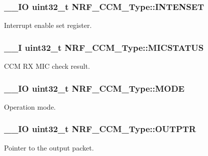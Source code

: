\subsubsection[{I\+N\+T\+E\+N\+S\+E\+T}]{\setlength{\rightskip}{0pt plus 5cm}\+\_\+\+\_\+\+I\+O uint32\+\_\+t N\+R\+F\+\_\+\+C\+C\+M\+\_\+\+Type\+::\+I\+N\+T\+E\+N\+S\+E\+T}\label{struct_n_r_f___c_c_m___type_a8f1c101c4fd7a2b467b577cbafd0fa63}
Interrupt enable set register. \hypertarget{struct_n_r_f___c_c_m___type_a0931287fd02302b690023d2b9bcf2841}{}
\subsubsection[{M\+I\+C\+S\+T\+A\+T\+U\+S}]{\setlength{\rightskip}{0pt plus 5cm}\+\_\+\+\_\+\+I uint32\+\_\+t N\+R\+F\+\_\+\+C\+C\+M\+\_\+\+Type\+::\+M\+I\+C\+S\+T\+A\+T\+U\+S}\label{struct_n_r_f___c_c_m___type_a0931287fd02302b690023d2b9bcf2841}
C\+C\+M R\+X M\+I\+C check result. \hypertarget{struct_n_r_f___c_c_m___type_a830de27d35211756104dcdf62403fa8d}{}
\subsubsection[{M\+O\+D\+E}]{\setlength{\rightskip}{0pt plus 5cm}\+\_\+\+\_\+\+I\+O uint32\+\_\+t N\+R\+F\+\_\+\+C\+C\+M\+\_\+\+Type\+::\+M\+O\+D\+E}\label{struct_n_r_f___c_c_m___type_a830de27d35211756104dcdf62403fa8d}
Operation mode. \hypertarget{struct_n_r_f___c_c_m___type_aa0bf67c2e2f890861fe71e3cc09914fa}{}
\subsubsection[{O\+U\+T\+P\+T\+R}]{\setlength{\rightskip}{0pt plus 5cm}\+\_\+\+\_\+\+I\+O uint32\+\_\+t N\+R\+F\+\_\+\+C\+C\+M\+\_\+\+Type\+::\+O\+U\+T\+P\+T\+R}\label{struct_n_r_f___c_c_m___type_aa0bf67c2e2f890861fe71e3cc09914fa}
Pointer to the output packet. \hypertarget{struct_n_r_f___c_c_m___type_ae2b5e83f5566c69365245dd8e639bd7c}{}

